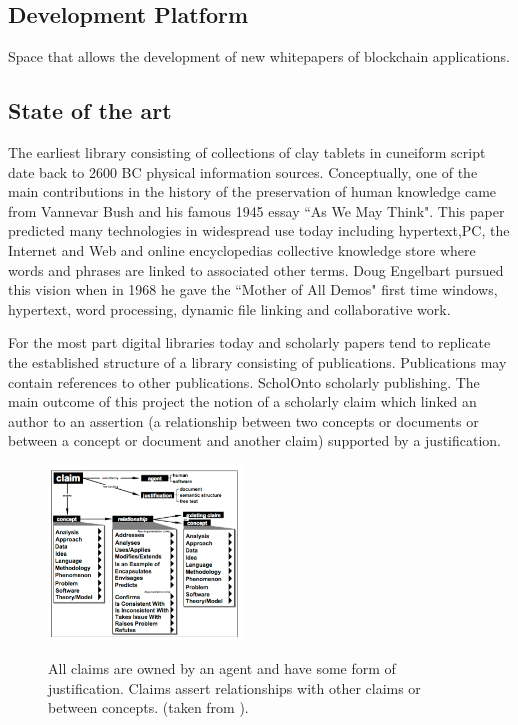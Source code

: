 \documentclass[twoside,twocolumn]{article}
\begin{document}
\subsection{Development Platform}
Space that allows the development of new whitepapers of blockchain applications.
 
\subsection{State of the art} 
The earliest library consisting of collections of clay tablets in cuneiform
script date back to 2600 BC %
physical information sources. Conceptually, one of the main contributions in the
history of the preservation of human knowledge came from Vannevar Bush and his
famous 1945 essay ``As We May Think". This paper predicted many technologies in
widespread use today including hypertext,PC, the Internet and Web and online
encyclopedias %
collective knowledge store where words and phrases are linked to associated
other terms. Doug Engelbart pursued this vision when in 1968 he gave the
``Mother of All Demos" %
first time windows, hypertext, word processing, dynamic file linking and
collaborative work.

For the most part digital libraries today and scholarly papers tend to replicate
the established structure of a library consisting of publications. Publications
may contain references to other publications. ScholOnto
scholarly publishing. The main outcome of this project the notion of a scholarly
claim which linked an author to an assertion (a relationship between two
concepts or documents or between a concept or document and another claim)
supported by a justification.

\begin{figure}[htbp]\centering
\caption{All claims are owned by an agent and have some form of justification. Claims assert relationships with other claims or between concepts. (taken from \cite{shum2000scholonto}).}
\includegraphics[width=0.46\textwidth]{scholonto-image}
\label{fig:scholonto}

\end{figure}
\end{document}

